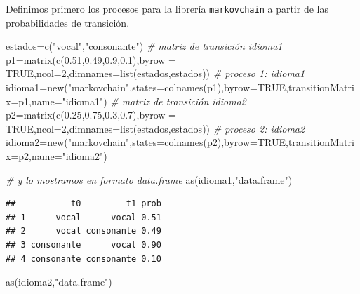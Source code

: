 \documentclass[
]{book}
\newenvironment{Shaded}{\begin{snugshade}}{\end{snugshade}}
\newcommand{\AttributeTok}[1]{\textcolor[rgb]{0.77,0.63,0.00}{#1}}
\newcommand{\CommentTok}[1]{\textcolor[rgb]{0.56,0.35,0.01}{\textit{#1}}}
\newcommand{\ConstantTok}[1]{\textcolor[rgb]{0.00,0.00,0.00}{#1}}
\newcommand{\DecValTok}[1]{\textcolor[rgb]{0.00,0.00,0.81}{#1}}
\newcommand{\FloatTok}[1]{\textcolor[rgb]{0.00,0.00,0.81}{#1}}
\newcommand{\FunctionTok}[1]{\textcolor[rgb]{0.00,0.00,0.00}{#1}}
\newcommand{\NormalTok}[1]{#1}
\newcommand{\OtherTok}[1]{\textcolor[rgb]{0.56,0.35,0.01}{#1}}
\newcommand{\StringTok}[1]{\textcolor[rgb]{0.31,0.60,0.02}{#1}}
\theoremstyle{definition}
\theoremstyle{definition}
\theoremstyle{definition}
\theoremstyle{definition}
\theoremstyle{remark}
\begin{document}
Definimos primero los procesos para la librería \texttt{markovchain} a partir de las probabilidades de transición.

\begin{Shaded}
\begin{Highlighting}[]
\NormalTok{estados}\OtherTok{=}\FunctionTok{c}\NormalTok{(}\StringTok{"vocal"}\NormalTok{,}\StringTok{"consonante"}\NormalTok{)}
\CommentTok{\# matriz de transición idioma1}
\NormalTok{p1}\OtherTok{=}\FunctionTok{matrix}\NormalTok{(}\FunctionTok{c}\NormalTok{(}\FloatTok{0.51}\NormalTok{,}\FloatTok{0.49}\NormalTok{,}\FloatTok{0.9}\NormalTok{,}\FloatTok{0.1}\NormalTok{),}\AttributeTok{byrow =} \ConstantTok{TRUE}\NormalTok{,}\AttributeTok{ncol=}\DecValTok{2}\NormalTok{,}\AttributeTok{dimnames=}\FunctionTok{list}\NormalTok{(estados,estados))}
\CommentTok{\# proceso 1: idioma1}
\NormalTok{idioma1}\OtherTok{=}\FunctionTok{new}\NormalTok{(}\StringTok{"markovchain"}\NormalTok{,}\AttributeTok{states=}\FunctionTok{colnames}\NormalTok{(p1),}\AttributeTok{byrow=}\ConstantTok{TRUE}\NormalTok{,}\AttributeTok{transitionMatrix=}\NormalTok{p1,}\AttributeTok{name=}\StringTok{"idioma1"}\NormalTok{)}
\CommentTok{\# matriz de transición idioma2}
\NormalTok{p2}\OtherTok{=}\FunctionTok{matrix}\NormalTok{(}\FunctionTok{c}\NormalTok{(}\FloatTok{0.25}\NormalTok{,}\FloatTok{0.75}\NormalTok{,}\FloatTok{0.3}\NormalTok{,}\FloatTok{0.7}\NormalTok{),}\AttributeTok{byrow =} \ConstantTok{TRUE}\NormalTok{,}\AttributeTok{ncol=}\DecValTok{2}\NormalTok{,}\AttributeTok{dimnames=}\FunctionTok{list}\NormalTok{(estados,estados))}
\CommentTok{\# proceso 2: idioma2}
\NormalTok{idioma2}\OtherTok{=}\FunctionTok{new}\NormalTok{(}\StringTok{"markovchain"}\NormalTok{,}\AttributeTok{states=}\FunctionTok{colnames}\NormalTok{(p2),}\AttributeTok{byrow=}\ConstantTok{TRUE}\NormalTok{,}\AttributeTok{transitionMatrix=}\NormalTok{p2,}\AttributeTok{name=}\StringTok{"idioma2"}\NormalTok{)}

\CommentTok{\# y lo mostramos en formato data.frame}
\FunctionTok{as}\NormalTok{(idioma1,}\StringTok{"data.frame"}\NormalTok{)}
\end{Highlighting}
\end{Shaded}

\begin{verbatim}
##           t0         t1 prob
## 1      vocal      vocal 0.51
## 2      vocal consonante 0.49
## 3 consonante      vocal 0.90
## 4 consonante consonante 0.10
\end{verbatim}

\begin{Shaded}
\begin{Highlighting}[]
\FunctionTok{as}\NormalTok{(idioma2,}\StringTok{"data.frame"}\NormalTok{)}
\end{Highlighting}
\end{Shaded}
\end{document}
